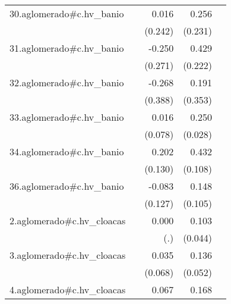 {\begin{longtable}{l*{4}{D{.}{.}{-1}}}
\addlinespace
30.aglomerado#c.hv\_banio&                     &       0.016         &       0.256         &                     \\
            &                     &     (0.242)         &     (0.231)         &                     \\
\addlinespace
31.aglomerado#c.hv\_banio&                     &      -0.250         &       0.429         &                     \\
            &                     &     (0.271)         &     (0.222)         &                     \\
\addlinespace
32.aglomerado#c.hv\_banio&                     &      -0.268         &       0.191         &                     \\
            &                     &     (0.388)         &     (0.353)         &                     \\
\addlinespace
33.aglomerado#c.hv\_banio&                     &       0.016         &       0.250\sym{***}&                     \\
            &                     &     (0.078)         &     (0.028)         &                     \\
\addlinespace
34.aglomerado#c.hv\_banio&                     &       0.202         &       0.432\sym{***}&                     \\
            &                     &     (0.130)         &     (0.108)         &                     \\
\addlinespace
36.aglomerado#c.hv\_banio&                     &      -0.083         &       0.148         &                     \\
            &                     &     (0.127)         &     (0.105)         &                     \\
\addlinespace
2.aglomerado#c.hv\_cloacas&                     &       0.000         &       0.103\sym{*}  &                     \\
            &                     &         (.)         &     (0.044)         &                     \\
\addlinespace
3.aglomerado#c.hv\_cloacas&                     &       0.035         &       0.136\sym{**} &                     \\
            &                     &     (0.068)         &     (0.052)         &                     \\
\addlinespace
4.aglomerado#c.hv\_cloacas&                     &       0.067         &       0.168\sym{***}&                     \\

\end{longtable}}
